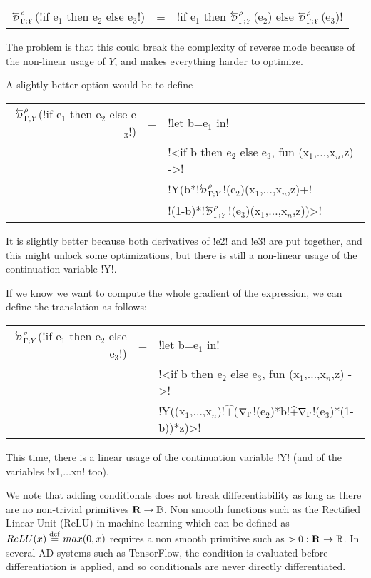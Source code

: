 \begin{tabular}{r c l}
$\directD{\rho}{\Gamma}{Y}$(!if e$_1$ then e$_2$ else e$_3$!) &=& !if e$_1$ then $\directD{\rho}{\Gamma}{Y}$(e$_2$) else $\directD{\rho}{\Gamma}{Y}$(e$_3$)! 
\end{tabular}

The problem is that this could break the complexity of reverse mode because of the non-linear usage of $Y$, and makes everything harder to optimize.

A slightly better option would be to define 

\begin{tabular}{r c l}
    $\directD{\rho}{\Gamma}{Y}$(!if e$_1$ then e$_2$ else e$_3$!) 
    &=& !let b=e$_1$ in!   \\
    && !<if b then e$_2$ else e$_3$, fun (x$_1$,$\ldots$,x$_n$,z) ->! \\
    && !Y(b*!$\directD{\rho}{\Gamma}{Y}$!(e$_2$)(x$_1$,$\ldots$,x$_n$,z)+!\\
    && \quad!(1-b)*!$\directD{\rho}{\Gamma}{Y}$!(e$_3$)(x$_1$,$\ldots$,x$_n$,z))>!
\end{tabular}

It is slightly better because both derivatives of !e2! and !e3! are put together, and this might unlock some optimizations, 
but there is still a non-linear usage of the continuation variable !Y!.

If we know we want to compute the whole gradient of the expression, we can define the translation as follows:

\begin{tabular}{r c l}
    $\directD{\rho}{\Gamma}{Y}$(!if e$_1$ then e$_2$ else e$_3$!) 
    &=& !let b=e$_1$ in!   \\
    && !<if b then e$_2$ else e$_3$, fun (x$_1$,$\ldots$,x$_n$,z) ->! \\
    && !Y((x$_1$,$\ldots$,x$_n$)!$\widehat{+}$($\nabla_\Gamma$!(e$_2$)*b!$\widehat{+}\nabla_\Gamma$!(e$_3$)*(1-b))*z)>!\\
\end{tabular}

This time, there is a linear usage of the continuation variable !Y! (and of the variables !x1,$\ldots$xn! too).

We note that adding conditionals does not break differentiability as long as there are no non-trivial primitives $\mathbf{R}\to\mathbb{B}$.
Non smooth functions such as the Rectified Linear Unit (ReLU) in machine learning which can be defined as $ReLU(x)\stackrel {\mathrm{def}}= max(0,x)$ 
requires a non smooth primitive such as $>0: \mathbf{R}\to\mathbb{B}$. In several AD systems such as TensorFlow, 
the condition is evaluated before differentiation is applied, and so conditionals are never directly differentiated.


